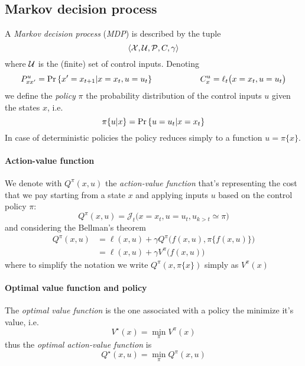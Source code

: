 \subsection*{Markov decision process}
	A \textit{Markov decision process} (\textit{MDP}) is described by the tuple
	\begin{equation}
		\langle \mathcal X, \mathcal U , \mathcal P, C, \gamma \rangle
	\end{equation}
	where $\mathcal U$ is the (finite) set of control inputs. Denoting
	\[ P_{xx'}^u = \textrm{Pr}\left\{x' = x_{t+1} | x = x_t, u = u_t \right\} \hspace{2cm} C_x^u = \ell_t \big(x = x_t, u = u_t\big) \]
	we define the \textit{policy} $\pi$ the probability distribution of the control inputs $u$ given the states $x$, i.e.
	\begin{equation}
		\pi\{u|x\} = \textrm{Pr}\left\{u = u_t | x = x_t\right\}
	\end{equation}
	In case of deterministic policies the policy reduces simply to a function $u = \pi\{x\}$.
	
	\paragraph{Action-value function} We denote with $Q^\pi(x,u)$ the \textit{action-value function} that's representing the cost that we pay starting from a state $x$ and applying inputs $u$ based on the control policy $\pi$:
	\begin{equation}
		Q^\pi(x,u) = \mathcal J_t\big(x = x_t, u = u_t, u_{k>t} \simeq \pi \big)
	\end{equation}
	and considering the Bellman's theorem
	\begin{align*}
		Q^\pi(x,u) & = \ell(x,u) + \gamma Q^\pi\Big(f(x,u), \pi \big\{ f(x,u) \big\}\Big) \\
		& = \ell(x,u) + \gamma V^\pi\big(f(x,u)\big) \tag{$\dagger$}
	\end{align*}
	where to simplify the notation we write $Q^\pi(x, \pi\{x\})$ simply as $V^\pi(x)$
	
	\paragraph{Optimal value function and policy} The \textit{optimal value function} is the one associated with a policy the minimize it's value, i.e.
	\begin{equation}
		V^\star (x) = \min_\pi V^\pi(x)
	\end{equation}
	thus the \textit{optimal action-value function} is
	\begin{equation}
		Q^\star(x,u) = \min_\pi Q^\pi(x,u) 
	\end{equation} 
	
